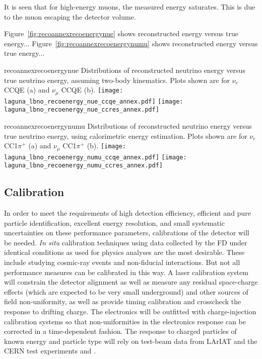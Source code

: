 It is seen that for high-energy muons, the measured energy saturates. This is due to the muon escaping the detector volume. 



Figure~\ref{fig:recoannexrecoenergynue} shows reconstructed energy versus true energy...
Figure~\ref{fig:recoannexrecoenergynumu} shows reconstructed energy versus true energy...

\begin{cdrfigure}{recoannexrecoenergynue}
{Distributions of reconstructed neutrino energy versus true neutrino energy, assuming two-body kinematics. 
Plots shown are for $\nu_{e}$ CCQE (a) and $\nu_{\mu}$ CCQE (b).}
\texttt{[image: laguna\_lbno\_recoenergy\_nue\_ccqe\_annex.pdf]}
\texttt{[image: laguna\_lbno\_recoenergy\_nue\_ccres\_annex.pdf]}
\end{cdrfigure}

\begin{cdrfigure}{recoannexrecoenergynumu}
{Distributions of reconstructed neutrino energy versus true neutrino energy, using calorimetric energy estimation. 
Plots shown are for  $\nu_{e}$  CC1$\pi^{+}$ (a) and $\nu_{\mu}$  CC1$\pi^{+}$ (b).}
\texttt{[image: laguna\_lbno\_recoenergy\_numu\_ccqe\_annex.pdf]}
\texttt{[image: laguna\_lbno\_recoenergy\_numu\_ccres\_annex.pdf]}
\end{cdrfigure}


\subsection{Calibration}

In order to meet the requirements of high detection efficiency, efficient and
pure particle identification, excellent energy resolution, and small systematic
uncertainties on these performance parameters, calibrations of the detector
will be needed.  {\it In situ} calibration techniques using data collected by the FD
under identical conditions as used for physics analyses are the most desirable.
These include studying cosmic-ray events and non-fiducial interactions.  But not
all performance measures can be calibrated in this way.  A laser calibration system
will constrain the detector alignment as well as measure any residual space-charge effects
(which are expected to be very small underground) and other sources of field non-uniformity,
as well as provide timing calibration and crosscheck the response to drifting charge.  
The electronics will be outfitted with
charge-injection calibration systems so that non-uniformities in the electronics response
can be corrected in a time-dependent fashion.  The response to charged particles of known
energy and particle type will rely on test-beam data from LArIAT and the CERN test
experiments \cernsingleproto{} and \cerndualproto.
